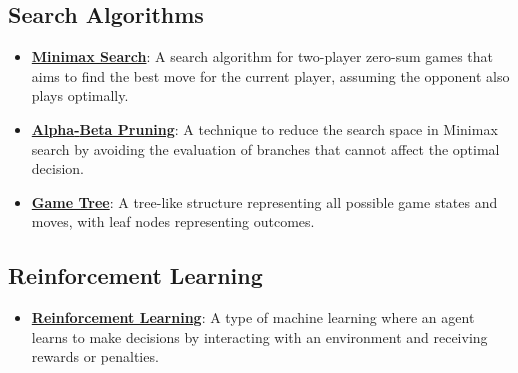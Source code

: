 \documentclass{article}%
\begin{document}
%
\subsection{Search Algorithms}%
\label{subsec:SearchAlgorithms}%
\begin{itemize}[leftmargin=*]%
\item \href{https://purdue.brightspace.com/d2l/common/assets/pdfjs-d2l-dist/1.0.14-legacy/web/viewer.html?file=\%2Fcontent\%2Fenforced\%2F1095467-wl.202510.CS.24300.001\%2F02L2-Intro.pdf\%3Fou\%3D1095467\&lang=en-us\&container=d2l-fileviewer-rendered-pdf\&fullscreen=d2l-fileviewer-rendered-pdf-dialog\&height=667#page=22}{\textbf{Minimax Search}}: A search algorithm for two{-}player zero{-}sum games that aims to find the best move for the current player, assuming the opponent also plays optimally.%
\item \href{https://purdue.brightspace.com/d2l/common/assets/pdfjs-d2l-dist/1.0.14-legacy/web/viewer.html?file=\%2Fcontent\%2Fenforced\%2F1095467-wl.202510.CS.24300.001\%2F02L2-Intro.pdf\%3Fou\%3D1095467\&lang=en-us\&container=d2l-fileviewer-rendered-pdf\&fullscreen=d2l-fileviewer-rendered-pdf-dialog\&height=667#page=23}{\textbf{Alpha{-}Beta Pruning}}: A technique to reduce the search space in Minimax search by avoiding the evaluation of branches that cannot affect the optimal decision.%
\item \href{https://purdue.brightspace.com/d2l/common/assets/pdfjs-d2l-dist/1.0.14-legacy/web/viewer.html?file=\%2Fcontent\%2Fenforced\%2F1095467-wl.202510.CS.24300.001\%2F02L2-Intro.pdf\%3Fou\%3D1095467\&lang=en-us\&container=d2l-fileviewer-rendered-pdf\&fullscreen=d2l-fileviewer-rendered-pdf-dialog\&height=667#page=11}{\textbf{Game Tree}}: A tree{-}like structure representing all possible game states and moves, with leaf nodes representing outcomes.%
\end{itemize}

%
\subsection{Reinforcement Learning}%
\label{subsec:ReinforcementLearning}%
\begin{itemize}[leftmargin=*]%
\item \href{https://purdue.brightspace.com/d2l/common/assets/pdfjs-d2l-dist/1.0.14-legacy/web/viewer.html?file=\%2Fcontent\%2Fenforced\%2F1095467-wl.202510.CS.24300.001\%2F02L2-Intro.pdf\%3Fou\%3D1095467\&lang=en-us\&container=d2l-fileviewer-rendered-pdf\&fullscreen=d2l-fileviewer-rendered-pdf-dialog\&height=667#page=46}{\textbf{Reinforcement Learning}}: A type of machine learning where an agent learns to make decisions by interacting with an environment and receiving rewards or penalties.%
\end{itemize}
\end{document}
